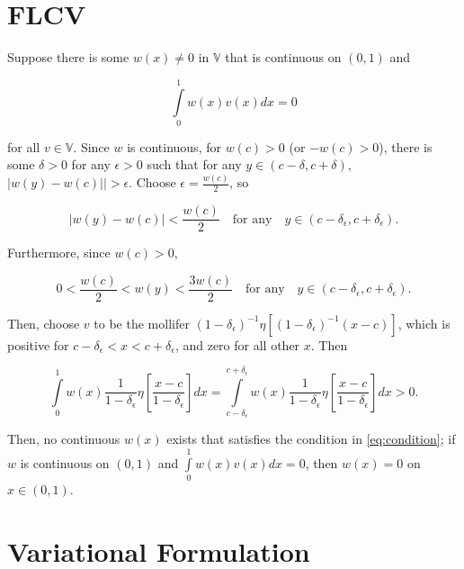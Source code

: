 \documentclass{hw-template}
\newcommand{\V}{\mathbb{V}}
\begin{document}
\section{FLCV}

Suppose there is some $w(x) \neq 0$ in $\V$ that is continuous on $(0, 1)$ and 

\begin{equation}\label{eq:condition}
    \int\limits_0^1 w(x)v(x)dx = 0
\end{equation}


for all $v\in \V$. Since $w$ is continuous, for $w(c) > 0$ (or $-w(c) > 0$), there is some $\delta > 0$ for any $\epsilon > 0$ such that for any $y \in (c-\delta, c+\delta)$, $\vert w(y) - w(c) \vert| > \epsilon$. Choose $\epsilon = \frac{w(c)}{2}$, so 

\begin{equation}
    \vert w(y) - w(c) \vert < \frac{w(c)}{2} \quad \text{for any} \quad y \in \left( c - \delta_\epsilon, c + \delta_\epsilon \right).
\end{equation}

Furthermore, since $w(c) > 0$,

\begin{equation}
    0 < \frac{w(c)}{2} < w(y) < \frac{3w(c)}{2}\quad \text{for any} \quad y \in \left( c - \delta_\epsilon, c + \delta_\epsilon \right).
\end{equation}

Then, choose $v$ to be the mollifer $(1-\delta_\epsilon)^{-1} \eta \left[(1 - \delta_\epsilon)^{-1} (x-c)\right]$, which is positive for $c-\delta_\epsilon < x < c+\delta_\epsilon$, and zero for all other $x$. Then

\begin{equation}
    \int\limits_0^1 w(x)\frac{1}{1 - \delta_\epsilon} \eta \left[\frac{x-c}{1 - \delta_\epsilon} \right]dx = \int\limits_{c-\delta_\epsilon}^{c+\delta_\epsilon} w(x)\frac{1}{1 - \delta_\epsilon} \eta \left[\frac{x-c}{1 - \delta_\epsilon} \right]dx > 0.
\end{equation}

Then, no continuous $w(x)$ exists that satisfies the condition in \autoref{eq:condition}; if $w$ is continuous on $(0, 1)$ and $\int\limits_0^1 w(x)v(x)dx = 0$, then $w(x) = 0$ on $x \in (0, 1)$.

\section{Variational Formulation}
\end{document}
